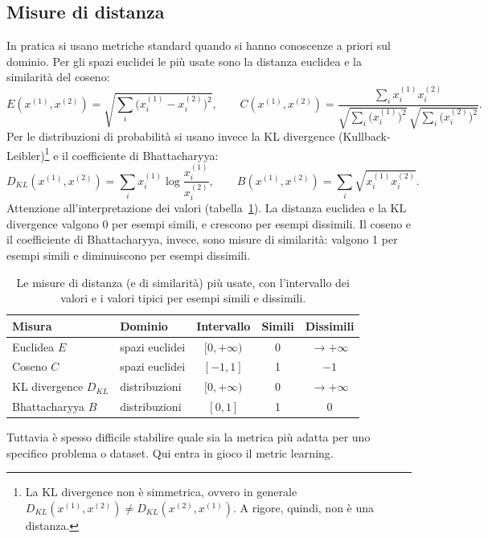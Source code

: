 \subsection{Misure di distanza}
In pratica si usano metriche standard quando si hanno conoscenze a priori sul dominio. Per gli spazi euclidei le più usate sono la distanza euclidea e la similarità del coseno:
\[
E(x^{(1)}, x^{(2)}) = \sqrt{\sum_i \big(x_i^{(1)} - x_i^{(2)}\big)^2}, \qquad
C(x^{(1)}, x^{(2)}) = \frac{\sum_i x_i^{(1)} x_i^{(2)}}{\sqrt{\sum_i \big(x_i^{(1)}\big)^2}\,\sqrt{\sum_i \big(x_i^{(2)}\big)^2}}.
\]
Per le distribuzioni di probabilità si usano invece la KL divergence (Kullback-Leibler)\footnote{La KL divergence non è simmetrica, ovvero in generale $D_{KL}(x^{(1)}, x^{(2)}) \neq D_{KL}(x^{(2)}, x^{(1)})$. A rigore, quindi, non è una distanza.} e il coefficiente di Bhattacharyya:
\[
D_{KL}(x^{(1)}, x^{(2)}) = \sum_i x_i^{(1)} \log \frac{x_i^{(1)}}{x_i^{(2)}}, \qquad
B(x^{(1)}, x^{(2)}) = \sum_i \sqrt{x_i^{(1)} x_i^{(2)}}.
\]
Attenzione all'interpretazione dei valori (tabella~\ref{tab:distanze}). La distanza euclidea e la KL divergence valgono 0 per esempi simili, e crescono per esempi dissimili. Il coseno e il coefficiente di Bhattacharyya, invece, sono misure di similarità: valgono 1 per esempi simili e diminuiscono per esempi dissimili.

\begin{table}[htbp]
\centering
\small
\begin{tabular}{@{}llccc@{}}
\toprule
Misura & Dominio & Intervallo & Simili & Dissimili \\
\midrule
Euclidea $E$ & spazi euclidei & $[0, +\infty)$ & 0 & $\to +\infty$ \\
Coseno $C$ & spazi euclidei & $[-1, 1]$ & 1 & $-1$ \\
KL divergence $D_{KL}$ & distribuzioni & $[0, +\infty)$ & 0 & $\to +\infty$ \\
Bhattacharyya $B$ & distribuzioni & $[0, 1]$ & 1 & 0 \\
\bottomrule
\end{tabular}
\caption{Le misure di distanza (e di similarità) più usate, con l'intervallo dei valori e i valori tipici per esempi simili e dissimili.}
\label{tab:distanze}
\end{table}

Tuttavia è spesso difficile stabilire quale sia la metrica più adatta per uno specifico problema o dataset. Qui entra in gioco il metric learning.

